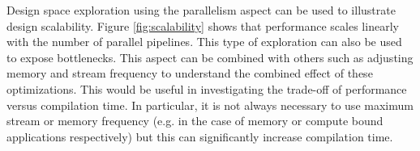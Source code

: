Design space exploration using the parallelism aspect can be used to
illustrate design scalability. Figure \ref{fig:scalability} shows that
performance scales linearly with the number of parallel
pipelines. This type of exploration can also be used to expose
bottlenecks. This aspect can be combined with others such as adjusting
memory and stream frequency to understand the combined effect of these
optimizations. This would be useful in investigating the trade-off of
performance versus compilation time. In particular, it is not always
necessary to use maximum stream or memory frequency (e.g. in the case
of memory or compute bound applications respectively) but this can
significantly increase compilation time.

